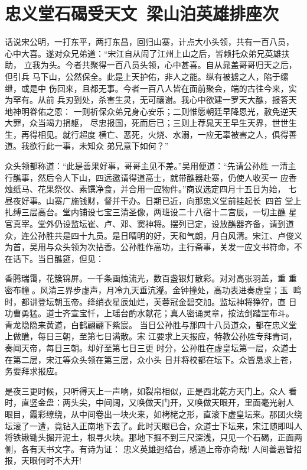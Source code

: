 \chapter{忠义堂石碣受天文~梁山泊英雄排座次}

话说宋公明，一打东平，两打东昌，回归山寨，计点大小头领，共有一百八员，
心中大喜。遂对众兄弟道：“宋江自从闹了江州上山之后，皆赖托众弟兄英雄扶助，
立我为头。今者共聚得一百八员头领，心中甚喜。自从晁盖哥哥归天之后，但引兵
马下山，公然保全。此是上天护佑，非人之能。纵有被掳之人，陷于缧绁，或是中
伤回来，且都无事。今者一百八人皆在面前聚会，端的古往今来，实为罕有。从前
兵刃到处，杀害生灵，无可禳谢。我心中欲建一罗天大醮，报答天地神明眷佑之恩：
一则祈保众弟兄身心安乐；二则惟愿朝廷早降恩光，赦免逆天大罪，众当竭力捐躯，
尽忠报国，死而后已；三则上荐晁天王早生天界，世世生生，再得相见。就行超度
横亡、恶死，火烧、水溺，一应无辜被害之人，俱得善道。我欲行此一事，未知众
弟兄意下如何？”

众头领都称道：“此是善果好事，哥哥主见不差。”吴用便道：“先请公孙胜
一清主行醮事，然后令人下山，四远邀请得道高士，就带醮器赴寨，仍使人收买一
应香烛纸马、花果祭仪、素馔净食，并合用一应物件。”商议选定四月十五日为始，
七昼夜好事。山寨广施钱财，督并干办。日期已近，向那忠义堂前挂起长，四首
堂上扎缚三层高台。堂内铺设七宝三清圣像，两班设二十八宿十二宫辰，一切主醮
星官真宰。堂外仍设监坛崔、卢、邓、窦神将。摆列已定，设放醮器齐备，请到道
众，连公孙胜共是四十九员。是日晴明的好，天和气朗，月白风清。宋江、卢俊义
为首，吴用与众头领为次拈香。公孙胜作高功，主行斋事，关发一应文书符命，不
在话下。当日醮筵，但见：

香腾瑞霭，花簇锦屏。一千条画烛流光，数百盏银灯散彩。对对高张羽盖，重
重密布幢。风清三界步虚声，月冷九天垂沆瀣。金钟撞处，高功表进奏虚皇；玉
鸣时，都讲登坛朝玉帝。绛绡衣星辰灿烂，芙蓉冠金碧交加。监坛神将狰狞，直
日功曹勇猛。道士齐宣宝忏，上瑶台酌水献花；真人密诵灵章，按法剑踏罡布斗。
青龙隐隐来黄道，白鹤翩翩下紫宸。
当日公孙胜与那四十八员道众，都在忠义堂上做醮，每日三朝，至第七日满散。宋
江要求上天报应，特教公孙胜专拜青词，奏闻天帝，每日三朝。却好至第七日三更
时分，公孙胜在虚皇坛第一层，众道士在第二层，宋江等众头领在第三层，众小头
目并将校都在坛下。众皆恳求上苍，务要拜求报应。

是夜三更时候，只听得天上一声响，如裂帛相似，正是西北乾方天门上。众人
看时，直竖金盘：两头尖，中间阔，又唤做天门开，又唤做天眼开，里面毫光射人
眼目，霞彩缭绕，从中间卷出一块火来，如栲栳之形，直滚下虚皇坛来。那团火绕
坛滚了一遭，竟钻入正南地下去了。此时天眼已合，众道士下坛来，宋江随即叫人
将铁锹锄头掘开泥土，根寻火块。那地下掘不到三尺深浅，只见一个石碣，正面两
侧，各有天书文字。有诗为证：
忠义英雄迥结台，感通上帝亦奇哉!
人间善恶皆招报，天眼何时不大开!

